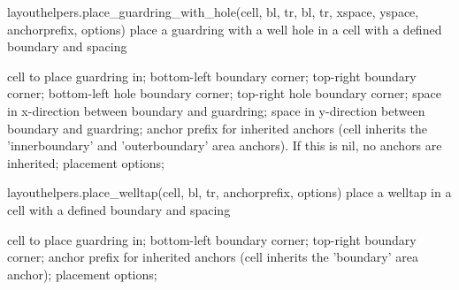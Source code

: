 \begin{APIfunc}{layouthelpers.place\_guardring\_with\_hole(cell, bl, tr, bl, tr, xspace, yspace, anchorprefix, options)}
    place a guardring with a well hole in a cell with a defined boundary and spacing
    \begin{APIparameters}
            cell to place guardring in;
            bottom-left boundary corner;
            top-right boundary corner;
            bottom-left hole boundary corner;
            top-right hole boundary corner;
            space in x-direction between boundary and guardring;
            space in y-direction between boundary and guardring;
            anchor prefix for inherited anchors (cell inherits the 'innerboundary' and 'outerboundary' area anchors). If this is nil, no anchors are inherited;
            placement options;
    \end{APIparameters}
\end{APIfunc}
\begin{APIfunc}{layouthelpers.place\_welltap(cell, bl, tr, anchorprefix, options)}
    place a welltap in a cell with a defined boundary and spacing
    \begin{APIparameters}
            cell to place guardring in;
            bottom-left boundary corner;
            top-right boundary corner;
            anchor prefix for inherited anchors (cell inherits the 'boundary' area anchor);
            placement options;
    \end{APIparameters}
\end{APIfunc}
